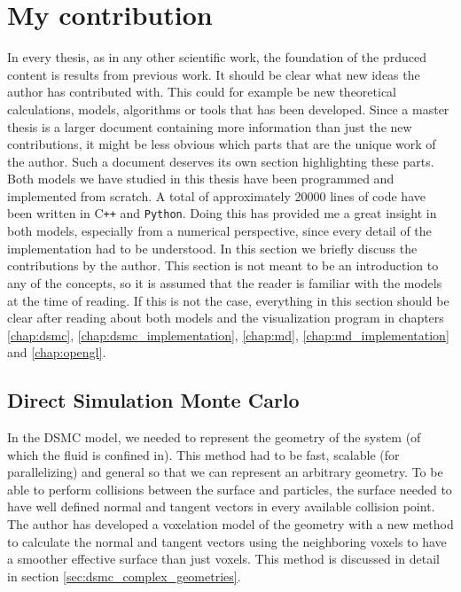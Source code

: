 \section{My contribution}
In every thesis, as in any other scientific work, the foundation of the prduced content is results from previous work. It should be clear what new ideas the author has contributed with. This could for example be new theoretical calculations, models, algorithms or tools that has been developed. Since a master thesis is a larger document containing more information than just the new contributions, it might be less obvious which parts that are the unique work of the author. Such a document deserves its own section highlighting these parts.\\
Both models we have studied in this thesis have been programmed and implemented from scratch. A total of approximately 20000 lines of code have been written in C{}\verb!++! and \verb!Python!. Doing this has provided me a great insight in both models, especially from a numerical perspective, since every detail of the implementation had to be understood. In this section we briefly discuss the contributions by the author. This section is not meant to be an introduction to any of the concepts, so it is assumed that the reader is familiar with the models at the time of reading. If this is not the case, everything in this section should be clear after reading about both models and the visualization program in chapters \ref{chap:dsmc}, \ref{chap:dsmc_implementation}, \ref{chap:md}, \ref{chap:md_implementation} and \ref{chap:opengl}.
\subsection{Direct Simulation Monte Carlo}
In the DSMC model, we needed to represent the geometry of the system (of which the fluid is confined in). This method had to be fast, scalable (for parallelizing) and general so that we can represent an arbitrary geometry. To be able to perform collisions between the surface and particles, the surface needed to have well defined normal and tangent vectors in every available collision point. The author has developed a voxelation model of the geometry with a new method to calculate the normal and tangent vectors using the neighboring voxels to have a smoother effective surface than just voxels. This method is discussed in detail in section \ref{sec:dsmc_complex_geometries}.
